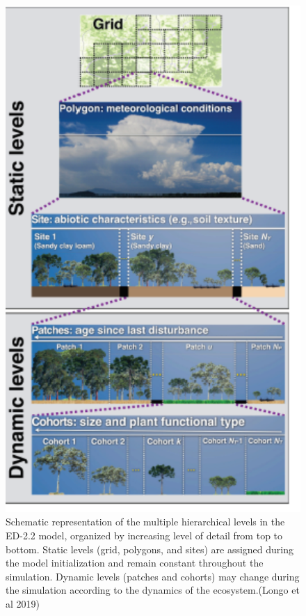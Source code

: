 \documentclass[12pt,oneside]{book}
\begin{document}
\begin{figure}

{\centering \includegraphics[width=0.8\linewidth]{figures/chap6/f615_ED_structure} 

}

\caption{Schematic representation of the multiple hierarchical levels in the ED-2.2 model, organized by increasing level of detail from top to bottom. Static levels (grid, polygons, and sites) are assigned during the model initialization and remain constant throughout the simulation. Dynamic levels (patches and cohorts) may change during the simulation according to the dynamics of the ecosystem.(Longo et al 2019)}\label{fig:f615}
\end{figure}
\end{document}
